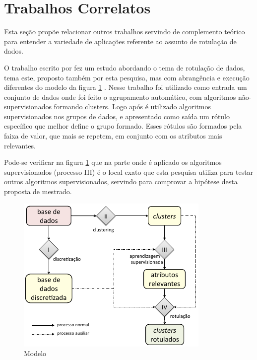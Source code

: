 \section{Trabalhos Correlatos}\label{cap:refTeor:sec:trabcorrel}

Esta seção propõe relacionar outros trabalhos servindo de complemento teórico para entender a variedade de aplicações referente ao assunto de rotulação de dados.

O trabalho escrito por  fez um estudo abordando o tema de rotulação de dados, tema este, proposto também por esta pesquisa, mas com abrangência e execução diferentes do modelo da figura \ref{fig:modeloLOPES} . Nesse trabalho foi utilizado como entrada um conjunto de dados onde foi feito o agrupamento automático, com algoritmos não-supervisionados formando  clusters. Logo após é utilizado algoritmos supervisionados nos grupos de dados, e apresentado como saída um rótulo específico que melhor define o grupo formado. Esses rótulos são formados pela faixa de valor, que mais se repetem, em conjunto com os atributos mais relevantes.

Pode-se verificar na figura \ref{fig:modeloLOPES} que na parte onde é aplicado os algoritmos supervisionados (processo III) é o local exato que esta pesquisa utiliza para testar outros algoritmos supervisionados, servindo para comprovar a hipótese desta proposta de mestrado.

\begin{figure}[h]
        \centering
        \includegraphics[scale=0.8]{figs/modeloLopes.png}
        \caption{Modelo \cite{LOPES2014}} 
        \label{fig:modeloLOPES}
\end{figure}


